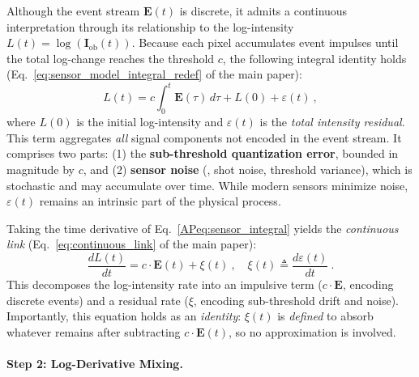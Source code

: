 Although the event stream $\mathbf{E}(t)$ is discrete, it admits a continuous interpretation through its relationship to the log-intensity $L(t) = \log(\mathbf{I}_{\mathrm{ob}}(t))$. Because each pixel accumulates event impulses until the total log-change reaches the threshold $c$, the following integral identity holds (Eq.~\ref*{eq:sensor_model_integral_redef} of the main paper):
%
\begin{equation}
    L(t) = c \int_{0}^{t} \mathbf{E}(\tau) \, d\tau + L(0) + \varepsilon(t)~,
    \label{APeq:sensor_integral}
\end{equation}
%
where $L(0)$ is the initial log-intensity and $\varepsilon(t)$ is the \emph{total intensity residual}. This term aggregates \emph{all} signal components not encoded in the event stream. It comprises two parts: (1) the \textbf{sub-threshold quantization error}, bounded in magnitude by $c$, and (2) \textbf{sensor noise} (\eg, shot noise, threshold variance), which is stochastic and may accumulate over time. While modern sensors minimize noise, $\varepsilon(t)$ remains an intrinsic part of the physical process.

Taking the time derivative of Eq.~\ref{APeq:sensor_integral} yields the \emph{continuous link} (Eq.~\ref*{eq:continuous_link} of the main paper):
%
\begin{equation}
    \frac{dL(t)}{dt} = c \cdot \mathbf{E}(t) + \xi(t)~, \quad \xi(t) \triangleq \frac{d\varepsilon(t)}{dt}~.
    \label{APeq:continuous_link}
\end{equation}
%
This decomposes the log-intensity rate into an impulsive term ($c \cdot \mathbf{E}$, encoding discrete events) and a residual rate ($\xi$, encoding sub-threshold drift and noise). Importantly, this equation holds as an \emph{identity}: $\xi(t)$ is \emph{defined} to absorb whatever remains after subtracting $c \cdot \mathbf{E}(t)$, so no approximation is involved.

\paragraph{Step 2: Log-Derivative Mixing.}

